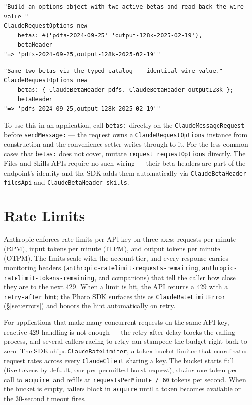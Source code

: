 \documentclass[a4paper,10pt,fleqn]{article}
\begin{document}
\begin{lstlisting}[language={}]
"Build an options object with two active betas and read back the wire value."
ClaudeRequestOptions new
    betas: #('pdfs-2024-09-25' 'output-128k-2025-02-19');
    betaHeader
"=> 'pdfs-2024-09-25,output-128k-2025-02-19'"
\end{lstlisting}

\begin{lstlisting}[language={}]
"Same two betas via the typed catalog -- identical wire value."
ClaudeRequestOptions new
    betas: { ClaudeBetaHeader pdfs. ClaudeBetaHeader output128k };
    betaHeader
"=> 'pdfs-2024-09-25,output-128k-2025-02-19'"
\end{lstlisting}

To use this in an application, call \texttt{betas:} directly on the
\texttt{ClaudeMessageRequest} before \texttt{sendMessage:} --- the
request owns a \texttt{ClaudeRequestOptions} instance from
construction and the convenience setter writes through to it.  For
the less common cases that \texttt{betas:} does not cover, mutate
\texttt{request requestOptions} directly.  The Files and Skills APIs
require no such wiring --- their beta headers are part of the
endpoint's identity and the SDK adds them automatically via
\texttt{ClaudeBetaHeader filesApi} and
\texttt{ClaudeBetaHeader skills}.

\medskip
{}

\section{Rate Limits}
\label{sec:rate-limits}

Anthropic enforces rate limits per API key on three axes: requests
per minute (RPM), input tokens per minute (ITPM), and output tokens
per minute (OTPM).  The limits scale with the account tier, and
every response carries monitoring headers
(\texttt{anthropic-ratelimit-requests-remaining},
\texttt{anthropic-ratelimit-tokens-remaining}, and companions) that
tell the caller how close they are to the next 429.  When a limit is
hit, the API returns a 429 with a \texttt{retry-after} hint; the
Pharo SDK surfaces this as \texttt{ClaudeRateLimitError}
(\S\ref{sec:errors}) and honors the hint automatically on retry.

For applications that make many concurrent requests on the same API
key, reactive 429 handling is not enough --- the retry-after delay
blocks the calling process, and several callers racing to retry can
stampede the budget right back to zero.  The SDK ships
\texttt{ClaudeRateLimiter}, a token-bucket limiter that coordinates
request rates across every \texttt{ClaudeClient} sharing a key.  The
bucket starts full (five tokens by default, one per permitted burst
request), drains one token per call to \texttt{acquire}, and refills
at \texttt{requestsPerMinute / 60} tokens per second.  When the
bucket is empty, callers block in \texttt{acquire} until a token
becomes available or the 30-second timeout fires.
\end{document}
